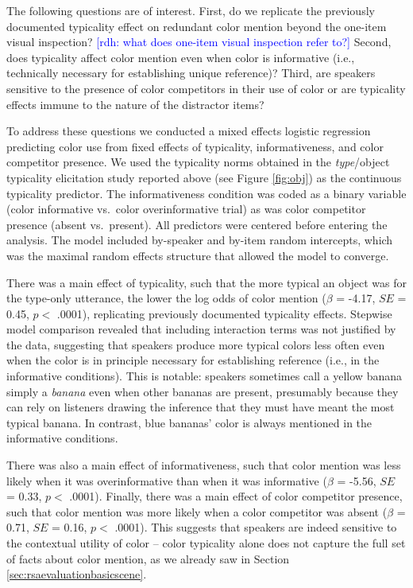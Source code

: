 \documentclass[11pt]{article}
\newcommand{\rdh}[1]{\textcolor{Blue}{[rdh: #1]}}
\newcommand{\figref}[1]{Figure \ref{#1}}
\newcommand{\sectionref}[1]{Section \ref{#1}}
\begin{document}
The following questions are of interest. First, do we replicate the previously documented typicality effect on redundant color mention beyond the one-item visual inspection? \rdh{what does one-item visual inspection refer to?} Second, does typicality affect color mention even when color is informative (i.e., technically necessary for establishing unique reference)? Third, are speakers sensitive to the presence of color competitors in their use of color or are typicality effects immune to the nature of the distractor items?

To address these questions we conducted a mixed effects logistic regression predicting color use from fixed effects of typicality, informativeness, and color competitor presence. We used the typicality norms obtained in the \emph{type}/object typicality elicitation study reported above (see \figref{fig:obj}) as the continuous typicality predictor. The informativeness condition was coded as a binary variable (color informative vs.~color overinformative trial) as was color competitor presence (absent vs.~present). All predictors were centered before entering the analysis. The model included by-speaker and by-item random intercepts, which was the maximal random effects structure that allowed the model to converge.

There was a main effect of typicality, such that the more typical an object was for the type-only utterance, the lower the log odds of color mention ($\beta$ = -4.17, $SE$ = 0.45, $p <$ .0001), replicating previously documented typicality effects. Stepwise model comparison revealed that including interaction terms was not justified by the data, suggesting that speakers produce more typical colors less often even when the color is in principle necessary for establishing reference (i.e., in the informative conditions). This is notable: speakers sometimes call a yellow banana simply a \emph{banana} even when other bananas are present, presumably because they can rely on listeners drawing the inference that they must have meant the most typical banana. In contrast, blue bananas' color is always mentioned in the informative conditions.

There was also a main effect of informativeness, such that color mention was less likely when it was overinformative than when it was informative ($\beta$ = -5.56, $SE$ = 0.33, $p <$ .0001). Finally, there was a main effect of color competitor presence, such that color mention was more likely when a color competitor was absent  ($\beta$ = 0.71, $SE$ = 0.16, $p <$ .0001). This suggests that speakers are indeed sensitive to the contextual utility of color -- color typicality alone does not capture the full set of facts about color mention, as we already saw in \sectionref{sec:rsaevaluationbasicscene}.
\end{document}
